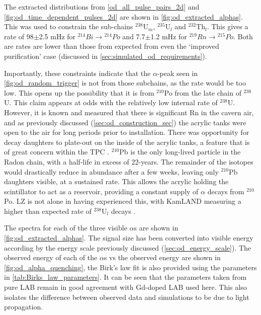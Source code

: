 \par
The extracted distributions from \autoref{od_all_pulse_pairs_2d} and \autoref{fig:od_time_dependent_pulses_2d} are shown in \autoref{fig:od_extracted_alphas}.
This was used to constrain the sub-chains ${}^{238}$U$_{m}$, ${}^{235}$U$_{l}$ and ${}^{232}$Th$_{l}$.
This gives a rate of 98$\pm$2.5 mHz for ${}^{214}Bi \to {}^{214}Po$ and 7.7$\pm$1.2 mHz for ${}^{219}Rn \to {}^{215}Po$.
Both are rates are lower than those from expected from even the `improved purification' case (discussed in \autoref{sec:simulated_od_requirements}).

\par
Importantly, these constraints indicate that the $\alpha$-peak seen in \autoref{fig:od_random_trigger} is not from those subchains, as the rate would be too low.
This opens up the possibility that it is from ${}^{210}$Po from the late chain of ${}^{238}$U. 
This claim appears at odds with the relatively low internal rate of ${}^{238}$U.
However, it is known and measured that there is significant Rn in the cavern air, and as previously discussed (\autoref{sec:od_construction_sec}) the acrylic tanks were open to the air for long periods prior to installation.
There was opportunity for decay daughters to plate-out on the inside of the acrylic tanks, a feature that is of great concern within the TPC \cite{radon_plateout_ref}.
${}^{210}$Pb is the only long-lived particle in the Radon chain, with a half-life in excess of 22-years. 
The remainder of the isotopes would drastically reduce in abundance after a few weeks, leaving only ${}^{210}$Pb daughters visible, at a sustained rate.
This allows the acrylic holding the scintillator to act as a reservoir, providing a constant supply of $\alpha$ decays from ${}^{210}$Po.
LZ is not alone in having experienced this, with KamLAND measuring a higher than expected rate of ${}^{238}$U$_l$ decays \cite{KamLAND_LS_contaminants_ref}.

\par
The spectra for each of the three visible $\alpha$s are shown in \autoref{fig:od_extracted_alphas}.
The signal size has been converted into visible energy according by the energy scale previously discussed (\autoref{sec:od_energy_scale}).
The observed energy of each of the $\alpha$s vs the observed energy are shown in \autoref{fig:od_alpha_quenching}, the Birk's law fit is also provided using the parameters in \autoref{tab:Birks_law_parameters}.
It can be seen that the parameters taken from pure LAB remain in good agreement with Gd-doped LAB used here.
This also isolates the difference between observed data and simulations to be due to light propagation.

